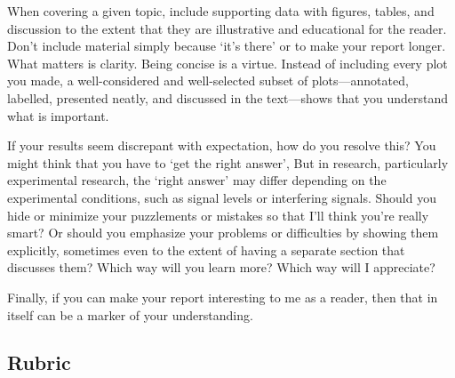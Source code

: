 \documentclass[12pt,preprint]{aastex}
\begin{document}
When covering a given topic, include supporting data with figures,
 tables, and discussion to the extent that they are illustrative and
 educational for the reader. Don't include material simply because `it's
 there' or to make your report longer. What matters is clarity. Being concise is a virtue. Instead of including every
 plot you made, a well-considered and
 well-selected subset of plots---annotated, labelled, presented neatly, and
discussed in the text---shows that you understand what is important.

If your results seem discrepant with expectation, how do you resolve
this? You might think that  you have to `get the right answer', But in
research, particularly experimental research, the `right answer' may
differ depending on the experimental conditions, such as signal levels
or interfering signals. Should you hide or minimize your puzzlements or
mistakes so that I'll think you're really smart? Or should you emphasize
your problems or difficulties by showing them explicitly, sometimes
even to the extent of having a separate section that discusses them?
Which way will you learn more? Which way will I appreciate?

Finally, if you can make your report interesting to me as a reader, then that in
 itself can be a marker of your  understanding. 
 
 \subsection{Rubric}
 
\end{document}
